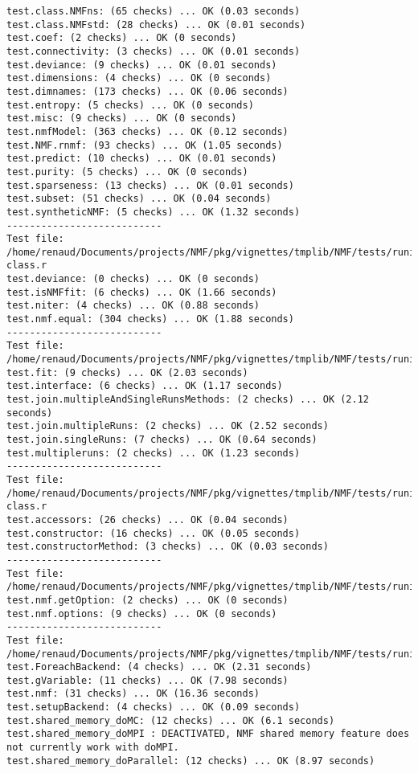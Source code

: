 \documentclass[10pt]{article}
\begin{document}
\begin{verbatim}
test.class.NMFns: (65 checks) ... OK (0.03 seconds)
test.class.NMFstd: (28 checks) ... OK (0.01 seconds)
test.coef: (2 checks) ... OK (0 seconds)
test.connectivity: (3 checks) ... OK (0.01 seconds)
test.deviance: (9 checks) ... OK (0.01 seconds)
test.dimensions: (4 checks) ... OK (0 seconds)
test.dimnames: (173 checks) ... OK (0.06 seconds)
test.entropy: (5 checks) ... OK (0 seconds)
test.misc: (9 checks) ... OK (0 seconds)
test.nmfModel: (363 checks) ... OK (0.12 seconds)
test.NMF.rnmf: (93 checks) ... OK (1.05 seconds)
test.predict: (10 checks) ... OK (0.01 seconds)
test.purity: (5 checks) ... OK (0 seconds)
test.sparseness: (13 checks) ... OK (0.01 seconds)
test.subset: (51 checks) ... OK (0.04 seconds)
test.syntheticNMF: (5 checks) ... OK (1.32 seconds)
--------------------------- 
Test file: /home/renaud/Documents/projects/NMF/pkg/vignettes/tmplib/NMF/tests/runit.NMFfit-class.r 
test.deviance: (0 checks) ... OK (0 seconds)
test.isNMFfit: (6 checks) ... OK (1.66 seconds)
test.niter: (4 checks) ... OK (0.88 seconds)
test.nmf.equal: (304 checks) ... OK (1.88 seconds)
--------------------------- 
Test file: /home/renaud/Documents/projects/NMF/pkg/vignettes/tmplib/NMF/tests/runit.NMFSet.r 
test.fit: (9 checks) ... OK (2.03 seconds)
test.interface: (6 checks) ... OK (1.17 seconds)
test.join.multipleAndSingleRunsMethods: (2 checks) ... OK (2.12 seconds)
test.join.multipleRuns: (2 checks) ... OK (2.52 seconds)
test.join.singleRuns: (7 checks) ... OK (0.64 seconds)
test.multipleruns: (2 checks) ... OK (1.23 seconds)
--------------------------- 
Test file: /home/renaud/Documents/projects/NMF/pkg/vignettes/tmplib/NMF/tests/runit.NMFStrategy-class.r 
test.accessors: (26 checks) ... OK (0.04 seconds)
test.constructor: (16 checks) ... OK (0.05 seconds)
test.constructorMethod: (3 checks) ... OK (0.03 seconds)
--------------------------- 
Test file: /home/renaud/Documents/projects/NMF/pkg/vignettes/tmplib/NMF/tests/runit.options.r 
test.nmf.getOption: (2 checks) ... OK (0 seconds)
test.nmf.options: (9 checks) ... OK (0 seconds)
--------------------------- 
Test file: /home/renaud/Documents/projects/NMF/pkg/vignettes/tmplib/NMF/tests/runit.parallel.r 
test.ForeachBackend: (4 checks) ... OK (2.31 seconds)
test.gVariable: (11 checks) ... OK (7.98 seconds)
test.nmf: (31 checks) ... OK (16.36 seconds)
test.setupBackend: (4 checks) ... OK (0.09 seconds)
test.shared_memory_doMC: (12 checks) ... OK (6.1 seconds)
test.shared_memory_doMPI : DEACTIVATED, NMF shared memory feature does not currently work with doMPI.
test.shared_memory_doParallel: (12 checks) ... OK (8.97 seconds)

\end{verbatim}
\end{document}
